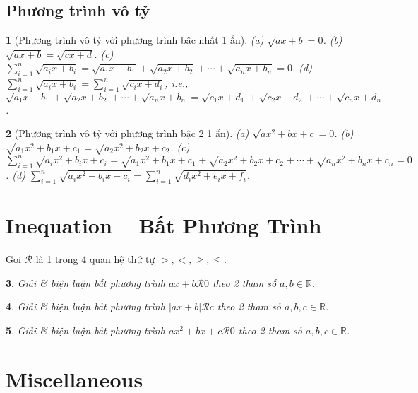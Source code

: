\documentclass{article}
\newtheorem{baitoan}{}
\begin{document}
\subsection{Phương trình vô tỷ}

\begin{baitoan}[Phương trình vô tỷ với phương trình bậc nhất 1 ẩn]
	(a) $\sqrt{ax + b} = 0$. (b) $\sqrt{ax + b} = \sqrt{cx + d}$. (c) $\sum_{i=1}^n \sqrt{a_ix + b_i} = \sqrt{a_1x + b_1} + \sqrt{a_2x + b_2} + \cdots + \sqrt{a_nx + b_n} = 0$. (d) $\sum_{i=1}^n \sqrt{a_ix + b_i} = \sum_{i=1}^n \sqrt{c_ix + d_i}$, i.e., $\sqrt{a_1x + b_1} + \sqrt{a_2x + b_2} + \cdots + \sqrt{a_nx + b_n} = \sqrt{c_1x + d_1} + \sqrt{c_2x + d_2} + \cdots + \sqrt{c_nx + d_n}$.
\end{baitoan}

\begin{baitoan}[Phương trình vô tỷ với phương trình bậc 2 1 ẩn]
	(a) $\sqrt{ax^2 + bx + c} = 0$. (b) $\sqrt{a_1x^2 + b_1x + c_1} = \sqrt{a_2x^2 + b_2x + c_2}$. (c) $\sum_{i=1}^n \sqrt{a_ix^2 + b_ix + c_i} = \sqrt{a_1x^2 + b_1x + c_1} + \sqrt{a_2x^2 + b_2x + c_2} + \cdots + \sqrt{a_nx^2 + b_nx + c_n} = 0$. (d) $\sum_{i=1}^n \sqrt{a_ix^2 + b_ix + c_i} = \sum_{i=1}^n \sqrt{d_ix^2 + e_ix + f_i}$.
\end{baitoan}


\section{Inequation -- Bất Phương Trình}
Gọi $\mathcal{R}$ là 1 trong 4 quan hệ thứ tự $>,<,\ge,\le$.

\begin{baitoan}
	Giải \& biện luận bất phương trình $ax + b\mathcal{R} 0$ theo 2 tham số $a,b\in\mathbb{R}$.
\end{baitoan}

\begin{baitoan}
	Giải \& biện luận bất phương trình $|ax + b|\mathcal{R} c$ theo 2 tham số $a,b,c\in\mathbb{R}$.
\end{baitoan}

\begin{baitoan}
	Giải \& biện luận bất phương trình $ax^2 + bx + c\mathcal{R} 0$ theo 2 tham số $a,b,c\in\mathbb{R}$.
\end{baitoan}


\section{Miscellaneous}


\printbibliography[heading=bibintoc]
	
\end{document}
